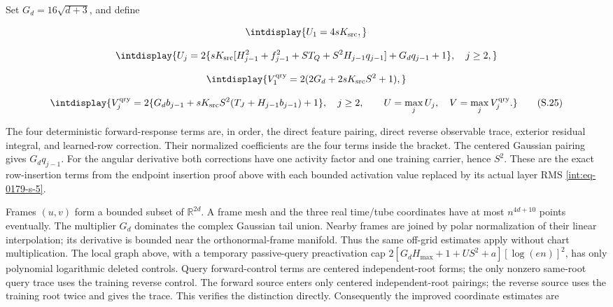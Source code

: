 
Set \(G_d=16\sqrt{d+3}\), and define


\begingroup\renewcommand{\theHequation}{intdisplay.404}
\begin{equation*}
\intdisplay{
U_1=4sK_{\rm src},
}
\end{equation*}
\endgroup

\begingroup\renewcommand{\theHequation}{intdisplay.405}
\begin{equation*}
\intdisplay{
U_j=2\{sK_{\rm src}[H_{j-1}^2+f_{j-1}^2+ST_Q
                  +S^2H_{j-1}q_{j-1}]+G_dq_{j-1}+1\},\quad j\ge2,
}
\end{equation*}
\endgroup

\begingroup\renewcommand{\theHequation}{intdisplay.406}
\begin{equation*}
\intdisplay{
V_1^{\rm qry}=2(2G_d+2sK_{\rm src}S^2+1),
}
\end{equation*}
\endgroup

\begingroup\renewcommand{\theHequation}{intdisplay.407}
\begin{equation}
\intdisplay{
V_j^{\rm qry}=2\{G_db_{j-1}+sK_{\rm src}S^2
                            (T_J+H_{j-1}b_{j-1})+1\},\quad j\ge2,
\qquad U=\max_jU_j,\quad V=\max_jV_j^{\rm qry}.
}
\tag{S.25}
\label{int:eq-0199-s-25}
\end{equation}
\endgroup


The four deterministic forward-response terms are, in order, the direct feature pairing, direct reverse observable trace, exterior residual integral, and learned-row correction. Their normalized coefficients are the four terms inside the bracket. The centered Gaussian pairing gives \(G_dq_{j-1}\). For the angular derivative both corrections have one activity factor and one training carrier, hence \(S^2\). These are the exact row-insertion terms from the endpoint insertion proof above with each bounded activation value replaced by its actual layer RMS \eqref{int:eq-0179-s-5}.



Frames \((u,\allowbreak v)\) form a bounded subset of \(\mathbb R^{2d}\). A frame mesh and the three real time/tube coordinates have at most \(n^{4d+10}\) points eventually. The multiplier \(G_d\) dominates the complex Gaussian tail union. Nearby frames are joined by polar normalization of their linear interpolation; its derivative is bounded near the orthonormal-frame manifold. Thus the same off-grid estimates apply without chart multiplication. The local graph above, with a temporary passive-query preactivation cap \(2[G_dH_{\max}+1+US^2+a][\log(en)]^2\), has only polynomial logarithmic deleted controls. Query forward-control terms are centered independent-root forms; the only nonzero same-root query trace uses the training reverse control. The forward source enters only centered independent-root pairings; the reverse source uses the training root twice and gives the trace. This verifies the distinction directly. Consequently the improved coordinate estimates are



